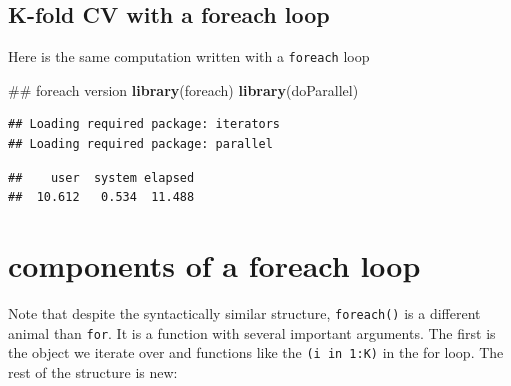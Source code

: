 \documentclass[]{article}
\newenvironment{Shaded}{\begin{snugshade}}{\end{snugshade}}
\newcommand{\KeywordTok}[1]{\textcolor[rgb]{0.13,0.29,0.53}{\textbf{{#1}}}}
\newcommand{\DataTypeTok}[1]{\textcolor[rgb]{0.13,0.29,0.53}{{#1}}}
\newcommand{\DecValTok}[1]{\textcolor[rgb]{0.00,0.00,0.81}{{#1}}}
\newcommand{\StringTok}[1]{\textcolor[rgb]{0.31,0.60,0.02}{{#1}}}
\newcommand{\OtherTok}[1]{\textcolor[rgb]{0.56,0.35,0.01}{{#1}}}
\newcommand{\NormalTok}[1]{{#1}}
\begin{document}
\subsection{K-fold CV with a foreach
loop}\label{k-fold-cv-with-a-foreach-loop}

Here is the same computation written with a \texttt{foreach} loop

\begin{Shaded}
\begin{Highlighting}[]
\NormalTok{## foreach version}
\KeywordTok{library}\NormalTok{(foreach)}
\KeywordTok{library}\NormalTok{(doParallel)}
\end{Highlighting}
\end{Shaded}

\begin{verbatim}
## Loading required package: iterators
## Loading required package: parallel
\end{verbatim}

\begin{Shaded}
\end{Shaded}

\begin{verbatim}
##    user  system elapsed 
##  10.612   0.534  11.488
\end{verbatim}

\section{components of a foreach
loop}\label{components-of-a-foreach-loop}

Note that despite the syntactically similar structure,
\texttt{foreach()} is a different animal than \texttt{for}. It is a
function with several important arguments. The first is the object we
iterate over and functions like the \texttt{(i in 1:K)} in the for loop.
The rest of the structure is new:
\end{document}
